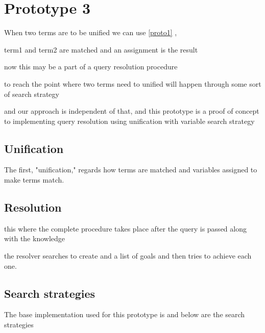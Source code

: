 \documentclass[thesis-solanki.tex]{files}
\begin{document}
\chapter{Prototype 3}{\label{proto3}}



When two terms are to be unified we can use \ref{proto1} ,

term1 and term2 are matched and an assignment is the result 

now this may be a part of a query resolution procedure

to reach the point where two terms need to unified will happen through some sort of search strategy

and our approach is independent of that, and this prototype is a proof of concept to implementing query resolution using unification with
variable search strategy


\section{Unification}
The first, "unification," regards how terms are matched and variables assigned to make terms match. \cite{website:prologunification}



\section{Resolution}
this where the complete procedure takes place after the query is passed along with the knowledge 

the resolver searches to create and a list of  goals and then tries to achieve each one.

\cite{website:prologresolution}

\cite{website:resolutionlogicwiki}




\section{Search strategies}
The base implementation used for this prototype  is \cite{website:mini-prolog-hugs98} and below are the search strategies 
\end{document}
